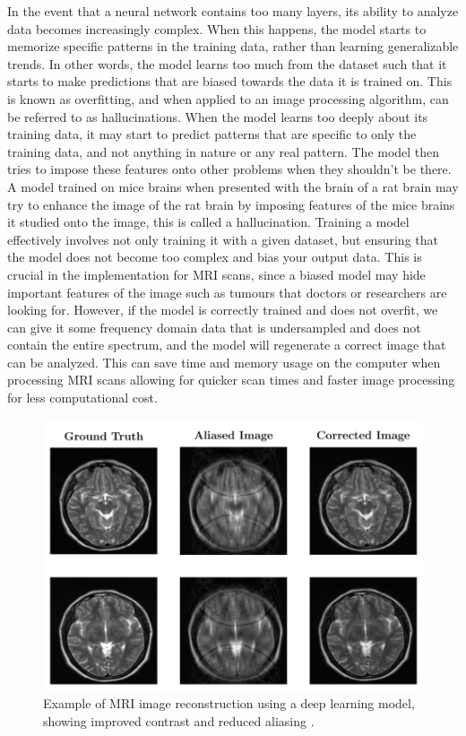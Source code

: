 \documentclass[14pt]{extreport}
\begin{document}
        In the event that a neural network contains too many layers, its ability to analyze data becomes increasingly complex. When this happens, the model starts to memorize specific patterns in the training data, rather than learning generalizable trends. In other words, the model learns too much from the dataset such that it starts to make predictions that are biased towards the data it is trained on. This is known as overfitting, and when applied to an image processing algorithm, can be referred to as hallucinations. When the model learns too deeply about its training data, it may start to predict patterns that are specific to only the training data, and not anything in nature or any real pattern. The model then tries to impose these features onto other problems when they shouldn't be there. A model trained on mice brains when presented with the brain of a rat brain may try to enhance the image of the rat brain by imposing features of the mice brains it studied onto the image, this is called a hallucination. Training a model effectively involves not only training it with a given dataset, but ensuring that the model does not become too complex and bias your output data. This is crucial in the implementation for MRI scans, since a biased model may hide important features of the image such as tumours that doctors or researchers are looking for. However, if the model is correctly trained and does not overfit, we can give it some frequency domain data that is undersampled and does not contain the entire spectrum, and the model will regenerate a correct image that can be analyzed. This can save time and memory usage on the computer when processing MRI scans allowing for quicker scan times and faster image processing for less computational cost. 

        \begin{figure}[h]
            \begin{center}
                \includegraphics[width = 0.6\linewidth]{Brain Images Corrected.png}
                \caption{Example of MRI image reconstruction using a deep learning model, showing improved contrast and reduced aliasing \cite{Hyun_Kim_Lee_Lee_Seo_2018}.}
            \end{center}
        \end{figure}
\end{document}
